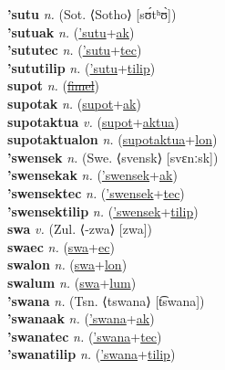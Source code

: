 \textbf{'sutu} \textit{n.} (Sot. ⟨Sotho⟩ [sʊ́tʰʊ̀])
 \label{'sutu} \\
\textbf{'sutuak} \textit{n.} (\hyperref['sutu]{'sutu}+\hyperref[ak]{ak})
 \label{'sutuak} \\
\textbf{'sututec} \textit{n.} (\hyperref['sutu]{'sutu}+\hyperref[tec]{tec})
 \label{'sututec} \\
\textbf{'sututilip} \textit{n.} (\hyperref['sutu]{'sutu}+\hyperref[tilip]{tilip})
 \label{'sututilip} \\
\textbf{supot} \textit{n.} (\hyperref[fimel]{\sout{fimel}})
 \label{supot} \\
\textbf{supotak} \textit{n.} (\hyperref[supot]{supot}+\hyperref[ak]{ak})
 \label{supotak} \\
\textbf{supotaktua} \textit{v.} (\hyperref[supot]{supot}+\hyperref[aktua]{aktua})
 \label{supotaktua} \\
\textbf{supotaktualon} \textit{n.} (\hyperref[supotaktua]{supotaktua}+\hyperref[lon]{lon})
 \label{supotaktualon} \\
\textbf{'swensek} \textit{n.} (Swe. ⟨svensk⟩ [svɛnːsk])
 \label{'swensek} \\
\textbf{'swensekak} \textit{n.} (\hyperref['swensek]{'swensek}+\hyperref[ak]{ak})
 \label{'swensekak} \\
\textbf{'swensektec} \textit{n.} (\hyperref['swensek]{'swensek}+\hyperref[tec]{tec})
 \label{'swensektec} \\
\textbf{'swensektilip} \textit{n.} (\hyperref['swensek]{'swensek}+\hyperref[tilip]{tilip})
 \label{'swensektilip} \\
\textbf{swa} \textit{v.} (Zul. ⟨-zwa⟩ [zwa])
 \label{swa} \\
\textbf{swaec} \textit{n.} (\hyperref[swa]{swa}+\hyperref[ec]{ec})
 \label{swaec} \\
\textbf{swalon} \textit{n.} (\hyperref[swa]{swa}+\hyperref[lon]{lon})
 \label{swalon} \\
\textbf{swalum} \textit{n.} (\hyperref[swa]{swa}+\hyperref[lum]{lum})
 \label{swalum} \\
\textbf{'swana} \textit{n.} (Tsn. ⟨tswana⟩ [t͡swana])
 \label{'swana} \\
\textbf{'swanaak} \textit{n.} (\hyperref['swana]{'swana}+\hyperref[ak]{ak})
 \label{'swanaak} \\
\textbf{'swanatec} \textit{n.} (\hyperref['swana]{'swana}+\hyperref[tec]{tec})
 \label{'swanatec} \\
\textbf{'swanatilip} \textit{n.} (\hyperref['swana]{'swana}+\hyperref[tilip]{tilip})
